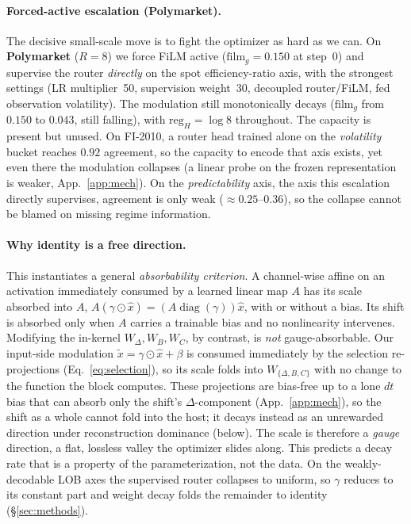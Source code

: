 \documentclass{article}
\DeclareMathOperator{\diagop}{diag}
\newcommand{\diag}{\diagop}
\begin{document}
\paragraph{Forced-active escalation (Polymarket).}
The decisive small-scale move is to fight the optimizer as hard as we can. On
\textbf{Polymarket} ($R{=}8$) we force FiLM active ($\mathrm{film}_g=0.150$ at
step~0) and supervise the router
\emph{directly} on the spot efficiency-ratio axis, with the strongest settings (LR
multiplier~50, supervision weight~30, decoupled router/FiLM, fed observation
volatility). The modulation still monotonically decays ($\mathrm{film}_g$ from
$0.150$ to $0.043$, still falling), with $\mathrm{reg}_H=\log 8$ throughout. The
capacity is present but unused. On FI-2010, a router head trained alone on the
\emph{volatility} bucket reaches $0.92$ agreement, so the capacity to encode that
axis exists, yet even there the modulation collapses (a linear probe on the frozen
representation is weaker, App.~\ref{app:mech}). On the \emph{predictability} axis,
the axis this escalation directly supervises, agreement is only weak
($\approx0.25$--$0.36$), so the collapse cannot be blamed on missing regime
information.

\paragraph{Why identity is a free direction.}
This instantiates a general \emph{absorbability criterion}. A channel-wise affine on
an activation immediately consumed by a learned linear map $A$ has its scale
absorbed into $A$, $A(\gamma\odot\hat x)=(A\diag(\gamma))\hat x$, with or without a
bias. Its shift is absorbed only when $A$ carries a trainable bias and no
nonlinearity intervenes. Modifying the in-kernel $W_\Delta,W_B,W_C$, by contrast,
is \emph{not} gauge-absorbable. Our input-side modulation
$\tilde{x}=\gamma\odot\hat{x}+\beta$ is consumed immediately by the selection
re-projections (Eq.~\eqref{eq:selection}), so its scale folds into
$W_{\{\Delta,B,C\}}$ with no change to the function the block computes. These
projections are bias-free up to a lone $dt$ bias that can absorb only the shift's
$\Delta$-component (App.~\ref{app:mech}), so the shift as a whole cannot fold into
the host; it decays instead as an unrewarded direction under reconstruction
dominance (below). The scale is
therefore a \emph{gauge} direction, a flat, lossless valley
the optimizer slides along. This predicts a decay rate that is a property of the
parameterization, not the data. On the weakly-decodable LOB axes the supervised
router collapses to uniform, so $\gamma$ reduces to its constant part and weight
decay folds the remainder to identity (\S\ref{sec:methods}).
\end{document}
